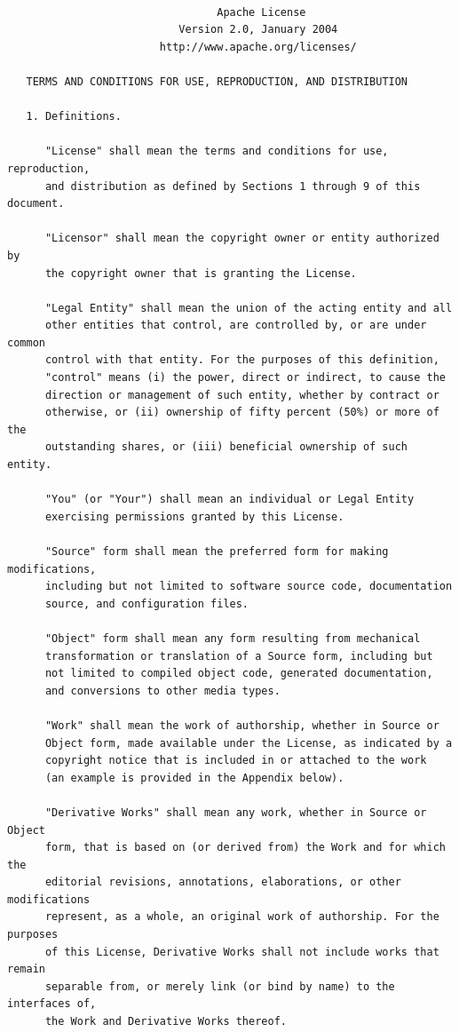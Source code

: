 \documentclass{book}
\begin{document}
\begin{verbatim}

                                 Apache License
                           Version 2.0, January 2004
                        http://www.apache.org/licenses/

   TERMS AND CONDITIONS FOR USE, REPRODUCTION, AND DISTRIBUTION

   1. Definitions.

      "License" shall mean the terms and conditions for use, reproduction,
      and distribution as defined by Sections 1 through 9 of this document.

      "Licensor" shall mean the copyright owner or entity authorized by
      the copyright owner that is granting the License.

      "Legal Entity" shall mean the union of the acting entity and all
      other entities that control, are controlled by, or are under common
      control with that entity. For the purposes of this definition,
      "control" means (i) the power, direct or indirect, to cause the
      direction or management of such entity, whether by contract or
      otherwise, or (ii) ownership of fifty percent (50%) or more of the
      outstanding shares, or (iii) beneficial ownership of such entity.

      "You" (or "Your") shall mean an individual or Legal Entity
      exercising permissions granted by this License.

      "Source" form shall mean the preferred form for making modifications,
      including but not limited to software source code, documentation
      source, and configuration files.

      "Object" form shall mean any form resulting from mechanical
      transformation or translation of a Source form, including but
      not limited to compiled object code, generated documentation,
      and conversions to other media types.

      "Work" shall mean the work of authorship, whether in Source or
      Object form, made available under the License, as indicated by a
      copyright notice that is included in or attached to the work
      (an example is provided in the Appendix below).

      "Derivative Works" shall mean any work, whether in Source or Object
      form, that is based on (or derived from) the Work and for which the
      editorial revisions, annotations, elaborations, or other modifications
      represent, as a whole, an original work of authorship. For the purposes
      of this License, Derivative Works shall not include works that remain
      separable from, or merely link (or bind by name) to the interfaces of,
      the Work and Derivative Works thereof.


\end{verbatim}
\end{document}
